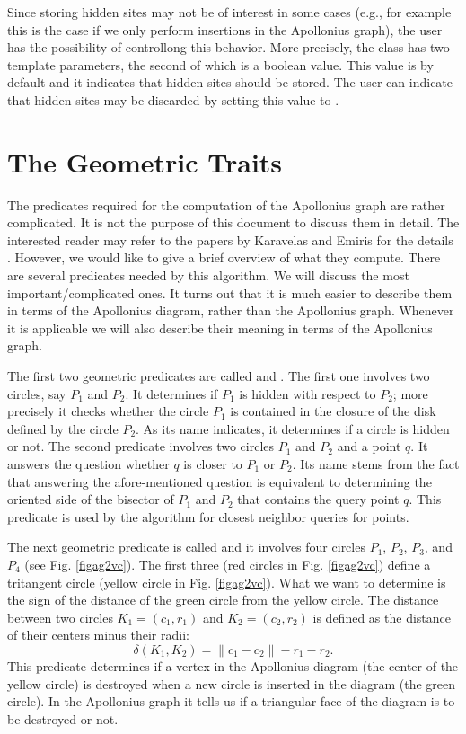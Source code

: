 Since storing hidden sites may not be of interest in some cases (e.g.,
for example this is the case if we only perform insertions in the
Apollonius graph), the user has the possibility of controllong this
behavior. More precisely, the class
 has two template
parameters, the second of which is a boolean value. This value is by
default  and it indicates that hidden sites should be
stored. The user can indicate that hidden sites may be discarded
by setting this value to .


\section{The Geometric Traits}
\label{sec:apollonius2-traits}

The predicates required for the computation of the Apollonius graph
are rather complicated. It is not the purpose of this document to
discuss them in detail. The interested reader may refer to the papers
by Karavelas and Emiris for the details
\cite{ke-ppawv-02,ke-rctac-03}. However, we would like to give a brief
overview of what they 
compute. There are several predicates needed by this algorithm. We
will discuss the most important/complicated ones. It turns out that
it is much easier to describe them in terms of the Apollonius diagram,
rather than the Apollonius graph. Whenever it is applicable we will also
describe their meaning in terms of the Apollonius graph.


The first two geometric predicates are called
 and . The first one
involves two circles, say $P_1$ and $P_2$. It determines if $P_1$ is
hidden with respect to $P_2$; more precisely it checks whether the
circle $P_1$ is contained in the closure of the disk defined by the
circle $P_2$. As its name indicates, it determines if a circle is
hidden or not. The second predicate involves two circles $P_1$ and
$P_2$ and a point $q$. It answers the question whether $q$ is closer
to $P_1$ or $P_2$. Its name stems from the fact that answering the
afore-mentioned question is equivalent to determining the oriented
side of the bisector of $P_1$ and $P_2$ that contains the query point
$q$. This predicate is used by the algorithm for closest neighbor
queries for points.


The next geometric predicate is called  and it
involves four circles $P_1$, $P_2$, $P_3$, and $P_4$ (see
Fig. \ref{figag2vc}). The first three (red circles in
Fig. \ref{figag2vc}) define a tritangent circle (yellow
circle in Fig. \ref{figag2vc}). What we want to determine is
the sign of the distance of the green circle from the yellow
circle. The distance between two circles $K_1=(c_1,r_1)$ and
$K_2=(c_2, r_2)$ is defined as the distance of their centers minus
their radii:
\[   \delta(K_1, K_2) = \|c_1-c_2\|-r_1-r_2. \]
This predicate determines if a vertex in the Apollonius diagram
(the center of the yellow circle) is destroyed when a new circle is
inserted in the diagram (the green circle). In the Apollonius graph
it tells us if a triangular face of the diagram is to be destroyed or
not.

